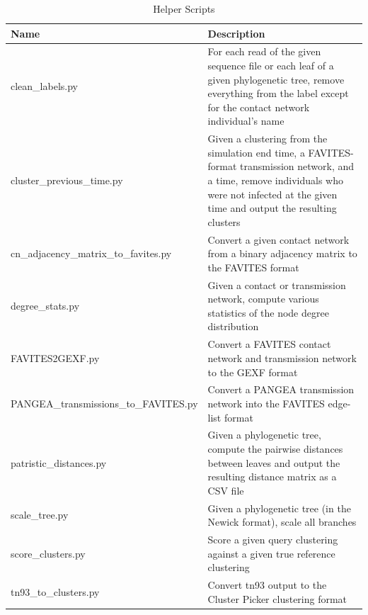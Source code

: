 \begin{table}[!ht]
\caption[Helper Scripts]{Helper Scripts}
\vspace{-0.25in}
\begin{center}
\begin{tabular}{|P{2.75in}|P{3.25in}|}
\hline
\textbf{Name} & \textbf{Description}  \\
\hline
clean\_labels.py & For each read of the given sequence file or each leaf of a given phylogenetic tree, remove everything from the label except for the contact network individual's name \\
\hline
cluster\_previous\_time.py & Given a clustering from the simulation end time, a FAVITES-format transmission network, and a time, remove individuals who were not infected at the given time and output the resulting clusters \\
\hline
cn\_adjacency\_matrix\_to\_favites.py & Convert a given contact network from a binary adjacency matrix to the FAVITES format \\
\hline
degree\_stats.py & Given a contact or transmission network, compute various statistics of the node degree distribution \\
\hline
FAVITES2GEXF.py & Convert a FAVITES contact network and transmission network to the GEXF format \\
\hline
PANGEA\_transmissions\_to\_FAVITES.py & Convert a PANGEA transmission network into the FAVITES edge-list format \\
\hline
patristic\_distances.py & Given a phylogenetic tree, compute the pairwise distances between leaves and output the resulting distance matrix as a CSV file \\
\hline
scale\_tree.py & Given a phylogenetic tree (in the Newick format), scale all branches \\
\hline
score\_clusters.py & Score a given query clustering against a given true reference clustering \\
\hline
tn93\_to\_clusters.py & Convert tn93 output to the Cluster Picker clustering format \\
\hline
\end{tabular}
\end{center}
\label{tab:favites-helper}
\end{table}

